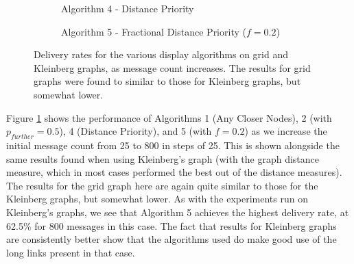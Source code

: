 \documentclass[bsc,frontabs,twoside,singlespacing,parskip,deptreport]{infthesis}     %
\begin{document}
\begin{figure}
%
\par\bigskip 
%
\begin{subfigure}[t]{0.40\textwidth}
\captionsetup{justification=centering}
\caption{Algorithm 4 - Distance Priority}
\end{subfigure}
%
\begin{subfigure}[t]{0.40\textwidth}
\captionsetup{justification=centering}
\caption{Algorithm 5 - Fractional Distance Priority ($f=0.2$)}
\end{subfigure}
\caption{Delivery rates for the various display algorithms on grid and Kleinberg graphs, as message count increases. The results for grid graphs were found to similar to those for Kleinberg graphs, but somewhat lower.}
\label{fig:grid_show_models}
\end{figure}

Figure \ref{fig:grid_show_models} shows the performance of Algorithms 1 (Any Closer Nodes), 2 (with $p_{further}=0.5$), 4 (Distance Priority), and 5 (with $f=0.2$) as we increase the initial message count from 25 to 800 in steps of 25. This is shown alongside the same results found when using Kleinberg's graph (with the graph distance measure, which in most cases performed the best out of the distance measures). The results for the grid graph here are again quite similar to those for the Kleinberg graphs, but somewhat lower. As with the experiments run on Kleinberg's graphs, we see that Algorithm 5 achieves the highest delivery rate, at 62.5\% for 800 messages in this case. The fact that results for Kleinberg graphs are consistently better show that the algorithms used do make good use of the long links present in that case.
\end{document}
